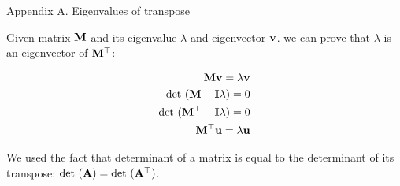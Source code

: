\documentclass{beamer}
\begin{document}










\myqrframe



\begin{frame}{Appendix A. Eigenvalues of transpose}
	\begin{flushleft}
		
		Given matrix $\mathbf{M}$ and its eigenvalue $\lambda$ and eigenvector $\mathbf{v}$. we can prove that $\lambda$ is an eigenvector of $\mathbf{M}^\top$:
		
		\begin{align}
			\mathbf{M}\mathbf{v} = \lambda \mathbf{v} \\
			\text{det}\ (\mathbf{M}- \mathbf{I} \lambda) = 0 \\
			\text{det}\ (\mathbf{M}^\top- \mathbf{I} \lambda) = 0 \\
			\mathbf{M}^\top\mathbf{u} = \lambda \mathbf{u}
		\end{align}
		
		We used the fact that determinant of a matrix is equal to the determinant of its transpose: $\text{det}\ (\bo{A}) = \text{det}\ (\bo{A}\T)$.
		
	\end{flushleft}
\end{frame}
\end{document}
